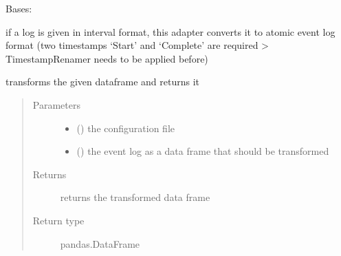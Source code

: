 \documentclass[letterpaper,10pt,english]{sphinxmanual}
\begin{document}
\begin{fulllineitems}
\label{\detokenize{event_log_analyzer:event_log_analyzer.adapter.IntervalToEventLogTransformer}}
\sphinxAtStartPar
Bases: {\hyperref[\detokenize{event_log_analyzer:event_log_analyzer.adapter.Adapter}]{}}

\sphinxAtStartPar
if a log is given in interval format, this adapter converts it to atomic event log format (two timestamps ‘Start’ and ‘Complete’ are required \sphinxhyphen{}\textgreater{} TimestampRenamer needs to be applied before)

\begin{fulllineitems}
\label{\detokenize{event_log_analyzer:event_log_analyzer.adapter.IntervalToEventLogTransformer.transform}}
\sphinxAtStartPar
transforms the given dataframe and returns it
\begin{quote}\begin{description}
\item[{Parameters}] \leavevmode\begin{itemize}
\item {} 
\sphinxAtStartPar
{} () \textendash{} the configuration file

\item {} 
\sphinxAtStartPar
{} () \textendash{} the event log as a data frame that should be transformed

\end{itemize}

\item[{Returns}] \leavevmode
\sphinxAtStartPar
returns the transformed data frame

\item[{Return type}] \leavevmode
\sphinxAtStartPar
pandas.DataFrame

\end{description}\end{quote}

\end{fulllineitems}


\end{fulllineitems}
\end{document}
